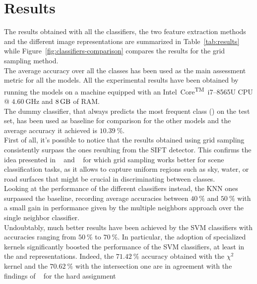 \documentclass[../main.tex]{subfiles}
\begin{document}
\section{Results}\label{sec:results}

The results obtained with all the classifiers, the two feature extraction
methods and the different image representations are summarized in
Table~\ref{tab:results} while Figure~\ref{fig:classifiers-comparison} compares
the results for the grid sampling method.\\
The average accuracy over all the classes has been used as the main assessment
metric for all the models. 
All the experimental results have been obtained by running the models on a machine equipped with an Intel\textsuperscript{\textregistered}~Core\textsuperscript{TM}~i7--8565U CPU @ $\SI{4.60}{\giga\hertz}$ and $\SI{8}{\giga\byte}$ of RAM.\\
The dummy classifier, that always predicts the most frequent class  () on the test set, has been used as baseline for comparison
for the other models and the average accuracy it achieved is $\SI{10.39}{\percent}$.\\
First of all, it's possible to notice that the results obtained using grid sampling consistently surpass the ones resulting from the SIFT detector. This confirms the idea presented in ~\cite{feifei} and ~\cite{lazebnik} for which grid sampling works better for scene classification tasks, as it allows to capture uniform regions such as sky, water, or road surfaces that might be crucial in discriminating between classes.\\
Looking at the performance of the different classifiers instead, the KNN ones
surpassed the baseline, recording average accuracies
between $\SI{40}{\percent}$ and $\SI{50}{\percent}$ with a small gain in
performance given by the multiple neighbors approach over the single
neighbor classifier.\\
Undoubtably, much better results have been achieved by the SVM
classifiers with accuracies ranging from $\SI{50}{\percent}$ to
$\SI{70}{\percent}$.
In particular, the adoption of specialized kernels significantly boosted the
performance of the SVM classifiers, at least in the  and 
representations.
Indeed, the $\SI{71.42}{\percent}$ accuracy obtained with the $\chi^2$ kernel
and the $\SI{70.62}{\percent}$ with the intersection one are in agreement with
the findings of ~\cite{gemert} for the hard assignment
\end{document}
